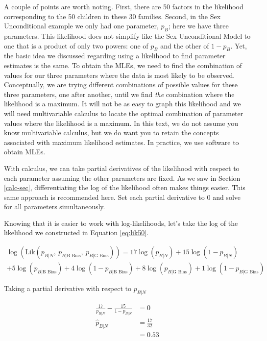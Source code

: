 \documentclass[
]{krantz}
\newcommand{\lik}{\mathrm{Lik}}
\newcommand{\neutral}{p_{B|N}}
\newcommand{\gbias}{p_{B|\textrm{G Bias}}}
\newcommand{\bbias}{p_{B|\textrm{B Bias}}}
\begin{document}
A couple of points are worth noting. First, there are 50 factors in the likelihood corresponding to the 50 children in these 30 families. Second, in the Sex Unconditional example we only had one parameter, \(p_{B}\); here we have three parameters. This likelihood does not simplify like the Sex Unconditional Model to one that is a product of only two powers: one of \(p_B\) and the other of \(1-p_B\). Yet, the basic idea we discussed regarding using a likelihood to find parameter estimates is the same. To obtain the MLEs, we need to find the combination of values for our three parameters where the data is most likely to be observed. Conceptually, we are trying different combinations of possible values for these three parameters, one after another, until we find \emph{the} combination where the likelihood is a maximum. It will not be as easy to graph this likelihood and we will need multivariable calculus to locate the optimal combination of parameter values where the likelihood is a maximum. In this text, we do not assume you know multivariable calculus, but we do want you to retain the concepts associated with maximum likelihood estimates. In practice, we use software to obtain MLEs.

With calculus, we can take partial derivatives of the likelihood with respect to each parameter assuming the other parameters are fixed. As we saw in Section \ref{calc-sec}, differentiating the log of the likelihood often makes things easier. This same approach is recommended here. Set each partial derivative to 0 and solve for all parameters simultaneously.

Knowing that it is easier to work with log-likelihoods, let's take the log of the likelihood we constructed in Equation \eqref{eq:lik50}.

\begin{multline*}
\log (\lik(\neutral,\ \bbias,\ \gbias)) = 
        17\log(\neutral)+15\log(1-\neutral) \\
        +5\log(\bbias)+4\log(1-\bbias) 
        +8\log(\gbias)+1\log(1-\gbias)
\end{multline*}

Taking a partial derivative with respect to \(\neutral\)

\begin{align*}
\frac{17}{\neutral}  - \frac{15}{1-\neutral}&=0 \\
\hat{p}_{B|N}&= \frac{17}{32} \\
&=0.53 \\
\end{align*}
\end{document}
